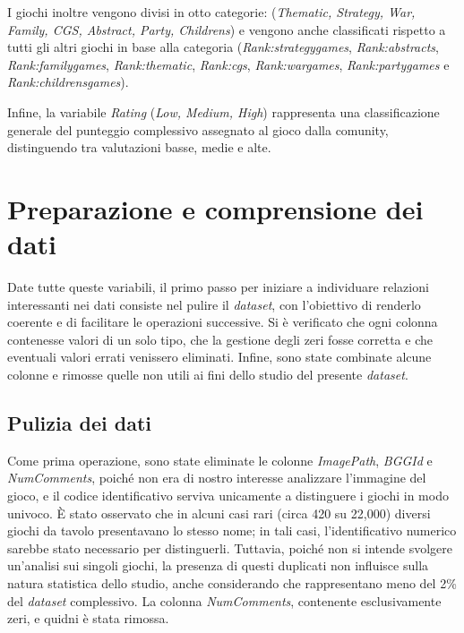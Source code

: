 \documentclass[10pt,twocolumn]{article}
\begin{document}
\smallskip
I giochi inoltre vengono divisi in otto categorie:  (\textit{Thematic, Strategy, War, Family, CGS, Abstract, Party, Childrens}) e vengono anche classificati rispetto a tutti gli altri giochi in base alla categoria (\textit{Rank:strategygames}, \textit{Rank:abstracts}, \textit{Rank:familygames}, \textit{Rank:thematic}, \textit{Rank:cgs}, \textit{Rank:wargames}, \textit{Rank:partygames} e \textit{Rank:childrensgames}). 

\smallskip
Infine, la variabile \textit{Rating} (\textit{Low, Medium, High}) rappresenta una classificazione generale del punteggio complessivo assegnato al gioco dalla comunity, distinguendo tra valutazioni basse, medie e alte.


\section{Preparazione e comprensione dei dati}

Date tutte queste variabili, il primo passo per iniziare a individuare relazioni interessanti nei dati consiste nel pulire il \textit{dataset}, con l’obiettivo di renderlo coerente e di facilitare le operazioni successive. 
Si è verificato che ogni colonna contenesse valori di un solo tipo, che la gestione degli zeri fosse corretta e che eventuali valori errati venissero eliminati. 
Infine, sono state combinate alcune colonne e rimosse quelle non utili ai fini dello studio del presente \textit{dataset}.

\subsection{Pulizia dei dati}
\label{sec:pulizia}

Come prima operazione, sono state eliminate le colonne \textit{ImagePath}, \textit{BGGId} e \textit{NumComments}, poiché non era di nostro interesse analizzare l’immagine del gioco, e il codice identificativo serviva unicamente a distinguere i giochi in modo univoco. 
È stato osservato che in alcuni casi rari (circa 420 su 22{,}000) diversi giochi da tavolo presentavano lo stesso nome; in tali casi, l’identificativo numerico sarebbe stato necessario per distinguerli. 
Tuttavia, poiché non si intende svolgere un’analisi sui singoli giochi, la presenza di questi duplicati non influisce sulla natura statistica dello studio, anche considerando che rappresentano meno del 2\% del \textit{dataset} complessivo.
La colonna \textit{NumComments}, contenente esclusivamente zeri, e quidni è stata rimossa.
\end{document}
